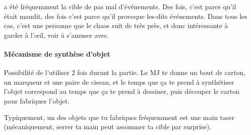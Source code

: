 {	\par \nmPlayerXI a été fréquemment la cible de pas mal d'événements. Des fois, c'est parce qu'il était maudit, des fois c'est parce qu'il provoque les-dits événements. Dans tous les cas, c'est une personne que le chaos suit de très près, et donc intéressante à garder à l'œil, voir à s'amuser avec.
	
	\paragraph{Mécanisme de synthèse d'objet} Possibilité de l'utiliser 2 fois durant la partie. Le MJ te donne un bout de carton, un marqueur et une paire de ciseau, et le temps que ça te prend à synthétiser l'objet correspond au temps que ça te prend à dessiner, puis découper le carton pour fabriquer l'objet.
	
	\par Typiquement, un des objets que tu fabriques fréquemment est une main taser (mécaniquement, serrer ta main peut assommer ta cible par surprise).
}






